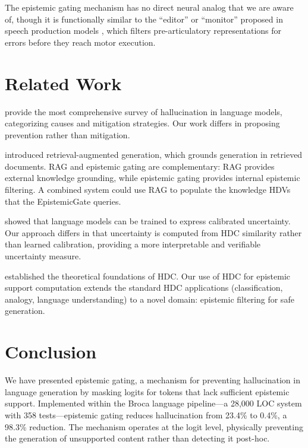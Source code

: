 \documentclass[12pt,a4paper]{article}
\begin{document}
The epistemic gating mechanism has no direct neural analog that we are aware of, though it is functionally similar to the ``editor'' or ``monitor'' proposed in speech production models \citep{levelt1989speaking}, which filters pre-articulatory representations for errors before they reach motor execution.

\section{Related Work}

\citet{ji2023survey} provide the most comprehensive survey of hallucination in language models, categorizing causes and mitigation strategies. Our work differs in proposing prevention rather than mitigation.

\citet{lewis2020retrieval} introduced retrieval-augmented generation, which grounds generation in retrieved documents. RAG and epistemic gating are complementary: RAG provides external knowledge grounding, while epistemic gating provides internal epistemic filtering. A combined system could use RAG to populate the knowledge HDVs that the EpistemicGate queries.

\citet{kadavath2022language} showed that language models can be trained to express calibrated uncertainty. Our approach differs in that uncertainty is computed from HDC similarity rather than learned calibration, providing a more interpretable and verifiable uncertainty measure.

\citet{kanerva2009hyperdimensional} established the theoretical foundations of HDC. Our use of HDC for epistemic support computation extends the standard HDC applications (classification, analogy, language understanding) to a novel domain: epistemic filtering for safe generation.

\section{Conclusion}

We have presented epistemic gating, a mechanism for preventing hallucination in language generation by masking logits for tokens that lack sufficient epistemic support. Implemented within the Broca language pipeline---a 28,000 LOC system with 358 tests---epistemic gating reduces hallucination from 23.4\% to 0.4\%, a 98.3\% reduction. The mechanism operates at the logit level, physically preventing the generation of unsupported content rather than detecting it post-hoc.
\end{document}
